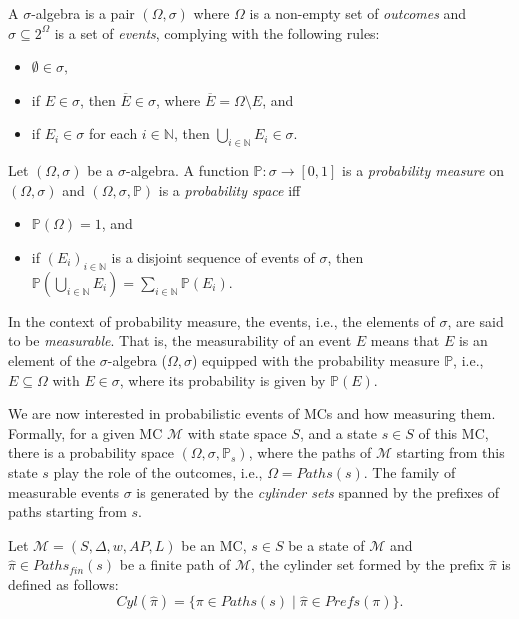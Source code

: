 \begin{definition}
  A $\sigma$-algebra is a pair $(\Omega, \sigma)$ where $\Omega$ is a non-empty set of \textit{outcomes} and $\sigma \subseteq 2^\Omega$ is a set of \textit{events}, complying with the following rules:
  \begin{itemize}
    \item $\emptyset \in \sigma,$
    \item if $E \in \sigma$, then $\overline{E} \in \sigma$, where $\overline{E} = \Omega \setminus E$, and
    \item if $E_i \in \sigma$ for each $i \in \mathbb{N}$, then $\bigcup_{i \in \mathbb{N}} E_i \in \sigma$.
  \end{itemize}
\end{definition}
\begin{definition}
  Let $(\Omega, \sigma)$ be a $\sigma$-algebra. A function $\mathbb{P}: \sigma \rightarrow [0, 1]$ is a \textit{probability measure} on $(\Omega, \sigma)$ and $(\Omega, \sigma, \mathbb{P})$ is a \textit{probability space} iff
  \begin{itemize}
    \item $\mathbb{P}(\Omega) = 1$, and
    \item if $(E_i)_{i \in \mathbb{N}}$ is a disjoint sequence of events of $\sigma$, then $\mathbb{P}(\bigcup_{i \in \mathbb{N}}E_i) = \sum_{i\in \mathbb{N}}\mathbb{P}(E_i)$.
  \end{itemize}
  In the context of probability measure, the events, i.e., the elements of $\sigma$, are said to be \textit{measurable}. That is, the measurability of an event $E$ means that $E$ is an element of the $\sigma$-algebra ($\Omega, \sigma$) equipped with the probability measure $\mathbb{P}$, i.e., $E \subseteq \Omega$ with $E \in \sigma$, where its probability is given by $\mathbb{P}(E)$.
\end{definition}

We are now interested in probabilistic events of MCs and how measuring them.
Formally, for a given MC $\mathcal{M}$ with state space $S$, and a state $s \in S$ of this MC, there is a probability space $(\Omega, \sigma, \mathbb{P}_s)$, where the paths of $\mathcal{M}$ starting from this state $s$ play the role of the outcomes, i.e., $\Omega = Paths(s)$.
The family of measurable events $\sigma$ is generated by the \textit{cylinder sets} spanned by the prefixes of paths starting from $s$.

\begin{definition}
Let $\mathcal{M} = (S, \Delta, w, AP, L)$ be an MC, $s \in S$ be a state of $\mathcal{M}$ and $\hat{\pi} \in Paths_{fin}(s)$ be a finite path of $\mathcal{M}$,
the cylinder set formed by the prefix $\hat{\pi}$ is defined as follows:
\[Cyl(\hat{\pi})=\{\pi\in Paths(s)\;|\;\hat{\pi}\in Prefs(\pi) \}. \]
\end{definition}

